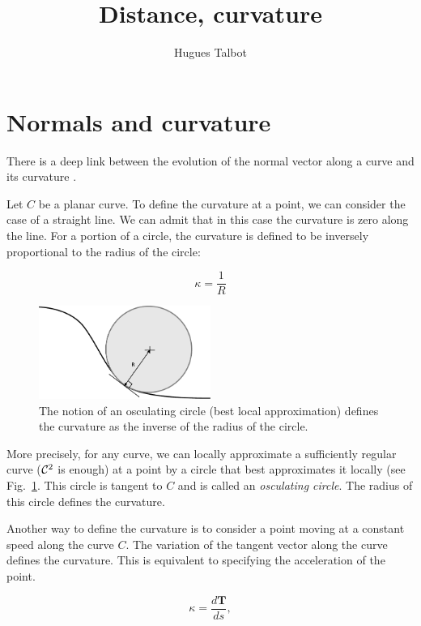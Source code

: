 \documentclass[11pt,a4paper]{article}
\title{Distance, curvature }
\author{Hugues Talbot}
\begin{document}
\maketitle
	
	
	\section{Normals and curvature}
	
	There is a deep link between the evolution of the normal vector along a curve and its curvature .
	
	Let $C$ be a planar curve. To define the curvature at a point, we can consider
	the case of a straight line. We can admit that in this case the curvature is zero along the line. For a portion of a circle, the curvature is defined to be inversely proportional to the radius of the circle:
	
	\begin{equation}
	\kappa = \frac{1}{R}
	\end{equation}
	
		\begin{figure}
			\centering
			\includegraphics[width=0.5\textwidth]{Drawings/Osculating.pdf}
			\caption{The notion of an osculating circle (best local approximation) defines the curvature as the inverse of the radius of the circle.\label{fig:oscul}}
		\end{figure}
	
	More precisely, for any curve, we can locally approximate a sufficiently regular curve (${\cal C}^2$ is enough) at a point by a circle that best approximates it locally (see Fig.~\ref{fig:oscul}. This circle is tangent to $C$ and is called an {\em osculating circle}. The radius of this circle defines the curvature.
	

	
	Another way to define the curvature is to consider a point moving at a constant speed along the curve $C$. The variation of the tangent vector along the curve defines the curvature. This is equivalent to specifying the acceleration of the point.
	
	
	\begin{equation}
	\kappa = \frac{d \mathbf{T}}{ds},
	\end{equation}
	
\end{document}
